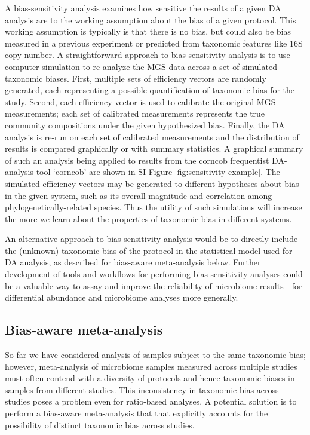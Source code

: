 \documentclass[
]{article}
\begin{document}
A bias-sensitivity analysis examines how sensitive the results of a given DA analysis are to the working assumption about the bias of a given protocol.
This working assumption is typically is that there is no bias, but could also be bias measured in a previous experiment or predicted from taxonomic features like 16S copy number.
A straightforward approach to bias-sensitivity analysis is to use computer simulation to re-analyze the MGS data across a set of simulated taxonomic biases.
First, multiple sets of efficiency vectors are randomly generated, each representing a possible quantification of taxonomic bias for the study.
Second, each efficiency vector is used to calibrate the original MGS measurements; each set of calibrated measurements represents the true community compositions under the given hypothesized bias.
Finally, the DA analysis is re-run on each set of calibrated measurements and the distribution of results is compared graphically or with summary statistics.
A graphical summary of such an analysis being applied to results from the corncob frequentist DA- analysis tool `corncob' are shown in SI Figure \ref{fig:sensitivity-example}.
The simulated efficiency vectors may be generated to different hypotheses about bias in the given system, such as its overall magnitude and correlation among phylogenetically-related species.
Thus the utility of such simulations will increase the more we learn about the properties of taxonomic bias in different systems.

An alternative approach to bias-sensitivity analysis would be to directly include the (unknown) taxonomic bias of the protocol in the statistical model used for DA analysis, as described for bias-aware meta-analysis below.
Further development of tools and workflows for performing bias sensitivity analyses could be a valuable way to assay and improve the reliability of microbiome results---for differential abundance and microbiome analyses more generally.

\hypertarget{bias-aware-meta-analysis}{%
\subsection{Bias-aware meta-analysis}\label{bias-aware-meta-analysis}}

So far we have considered analysis of samples subject to the same taxonomic bias;
however, meta-analysis of microbiome samples measured across multiple studies must often contend with a diversity of protocols and hence taxonomic biases in samples from different studies.
This inconsistency in taxonomic bias across studies poses a problem even for ratio-based analyses.
A potential solution is to perform a bias-aware meta-analysis that that explicitly accounts for the possibility of distinct taxonomic bias across studies.
\end{document}
